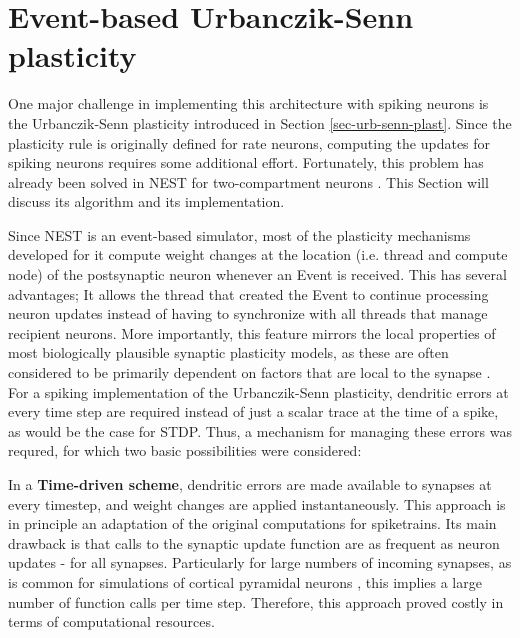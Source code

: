 \section{Event-based Urbanczik-Senn plasticity}\label{sec-event-urb}

One major challenge in implementing this architecture with spiking neurons is the Urbanczik-Senn plasticity introduced
in Section \ref{sec-urb-senn-plast}. Since the plasticity rule is originally defined for rate neurons, computing the
updates for spiking neurons requires some additional effort. Fortunately, this problem has already been solved in NEST
for two-compartment neurons \citep{Stapmanns2021}. This Section will discuss its algorithm and its implementation.
\newline

Since NEST is an event-based simulator, most of the plasticity mechanisms developed for it compute weight changes at the
location (i.e. thread and compute node) of the postsynaptic neuron whenever an Event is received. This has several
advantages; It allows the thread that created the Event to continue processing neuron updates instead of having to
synchronize with all threads that manage recipient neurons.  More importantly, this feature mirrors the local properties
of most biologically plausible synaptic plasticity models, as these are often considered to be primarily dependent on
factors that are local to the synapse \citep{magee2020synaptic}. For a spiking implementation of the Urbanczik-Senn
plasticity, dendritic errors at every time step are required instead of just a scalar trace at the time of a spike, as
would be the case for STDP. Thus, a mechanism for managing these errors was requred, for which two basic possibilities
were considered:

In a \textbf{Time-driven scheme}, dendritic errors are made available to synapses at every timestep, and weight changes
are applied instantaneously. This approach is in principle an adaptation of the original computations for spiketrains.
Its main drawback is that calls to the synaptic update function are as frequent as neuron updates - for all synapses.
Particularly for large numbers of incoming synapses, as is common for simulations of cortical pyramidal neurons
\citep{potjans2014cell,vezoli2004quantitative}, this implies a large number of function calls per time step.  Therefore,
this approach proved costly in terms of computational resources.

